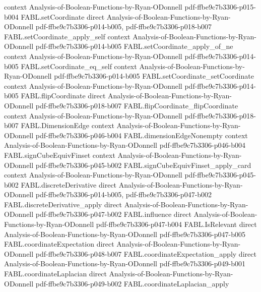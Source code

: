 \begin{theorem}
  {context}
  {Analysis-of-Boolean-Functions-by-Ryan-ODonnell}
  {pdf-ffbe9c7b3306-p015-b004}
\proofstep
  {FABL.setCoordinate}
  {direct}
  {Analysis-of-Boolean-Functions-by-Ryan-ODonnell}
  {pdf-ffbe9c7b3306-p014-b005,
    pdf-ffbe9c7b3306-p018-b007}
\proofstep
  {FABL.setCoordinate_apply_self}
  {context}
  {Analysis-of-Boolean-Functions-by-Ryan-ODonnell}
  {pdf-ffbe9c7b3306-p014-b005}
\proofstep
  {FABL.setCoordinate_apply_of_ne}
  {context}
  {Analysis-of-Boolean-Functions-by-Ryan-ODonnell}
  {pdf-ffbe9c7b3306-p014-b005}
\proofstep
  {FABL.setCoordinate_eq_self}
  {context}
  {Analysis-of-Boolean-Functions-by-Ryan-ODonnell}
  {pdf-ffbe9c7b3306-p014-b005}
\proofstep
  {FABL.setCoordinate_setCoordinate}
  {context}
  {Analysis-of-Boolean-Functions-by-Ryan-ODonnell}
  {pdf-ffbe9c7b3306-p014-b005}
\proofstep
  {FABL.flipCoordinate}
  {direct}
  {Analysis-of-Boolean-Functions-by-Ryan-ODonnell}
  {pdf-ffbe9c7b3306-p018-b007}
\proofstep
  {FABL.flipCoordinate_flipCoordinate}
  {context}
  {Analysis-of-Boolean-Functions-by-Ryan-ODonnell}
  {pdf-ffbe9c7b3306-p018-b007}
\proofstep
  {FABL.DimensionEdge}
  {context}
  {Analysis-of-Boolean-Functions-by-Ryan-ODonnell}
  {pdf-ffbe9c7b3306-p046-b004}
\proofstep
  {FABL.dimensionEdgeNonempty}
  {context}
  {Analysis-of-Boolean-Functions-by-Ryan-ODonnell}
  {pdf-ffbe9c7b3306-p046-b004}
\proofstep
  {FABL.signCubeEquivFinset}
  {context}
  {Analysis-of-Boolean-Functions-by-Ryan-ODonnell}
  {pdf-ffbe9c7b3306-p045-b002}
\proofstep
  {FABL.signCubeEquivFinset_apply_card}
  {context}
  {Analysis-of-Boolean-Functions-by-Ryan-ODonnell}
  {pdf-ffbe9c7b3306-p045-b002}
\proofstep
  {FABL.discreteDerivative}
  {direct}
  {Analysis-of-Boolean-Functions-by-Ryan-ODonnell}
  {pdf-ffbe9c7b3306-p014-b005,
    pdf-ffbe9c7b3306-p047-b002}
\proofstep
  {FABL.discreteDerivative_apply}
  {direct}
  {Analysis-of-Boolean-Functions-by-Ryan-ODonnell}
  {pdf-ffbe9c7b3306-p047-b002}
\proofstep
  {FABL.influence}
  {direct}
  {Analysis-of-Boolean-Functions-by-Ryan-ODonnell}
  {pdf-ffbe9c7b3306-p047-b004}
\proofstep
  {FABL.IsRelevant}
  {direct}
  {Analysis-of-Boolean-Functions-by-Ryan-ODonnell}
  {pdf-ffbe9c7b3306-p047-b005}
\proofstep
  {FABL.coordinateExpectation}
  {direct}
  {Analysis-of-Boolean-Functions-by-Ryan-ODonnell}
  {pdf-ffbe9c7b3306-p048-b007}
\proofstep
  {FABL.coordinateExpectation_apply}
  {direct}
  {Analysis-of-Boolean-Functions-by-Ryan-ODonnell}
  {pdf-ffbe9c7b3306-p049-b001}
\proofstep
  {FABL.coordinateLaplacian}
  {direct}
  {Analysis-of-Boolean-Functions-by-Ryan-ODonnell}
  {pdf-ffbe9c7b3306-p049-b002}
\proofstep
  {FABL.coordinateLaplacian_apply}

\end{theorem}
